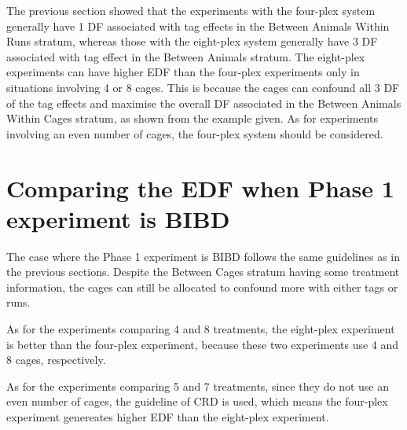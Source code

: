 \documentclass[12pt,a4paper]{article}
\begin{document}
The previous section showed that the experiments with the four-plex system generally have 1 DF associated with tag effects in the Between Animals Within Runs stratum, whereas those with the eight-plex system generally have 3 DF associated with tag effect in the Between Animals stratum. The eight-plex experiments can have higher EDF than the four-plex experiments only in situations involving 4 or 8 cages. This is because the cages can confound all 3 DF of the tag effects and maximise the overall DF associated in the Between Animals Within Cages stratum, as shown from the example given. As for experiments involving an even number of cages,  the four-plex system should be considered. 


\section{Comparing the EDF when Phase 1 experiment is BIBD}
The case where the Phase 1 experiment is BIBD follows the same guidelines as in the previous sections. Despite the Between Cages stratum having some treatment information, the cages can still be allocated to confound more with either tags or runs. 

As for the experiments comparing 4 and 8 treatments, the eight-plex experiment is better than the four-plex experiment, because these two experiments use 4 and 8 cages, respectively.  

As for the experiments comparing 5 and 7 treatments, since they do not use an even number of cages, the guideline of CRD is used, which means the four-plex experiment genereates higher EDF than the eight-plex experiment. 
\end{document}
